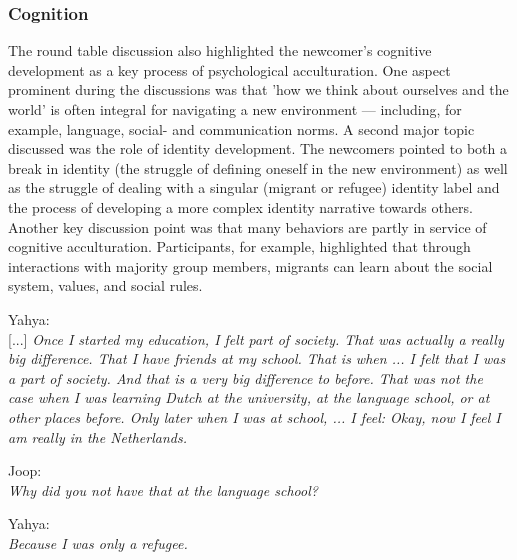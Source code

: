 \documentclass[man, 12pt, a4paper]{apa7}
\begin{document}
\subsubsection{Cognition}
The round table discussion also highlighted the newcomer’s cognitive development as a key process of psychological acculturation. One aspect prominent during the discussions was that 'how we think about ourselves and the world' is often integral for navigating a new environment --- including, for example, language, social- and communication norms. A second major topic discussed was the role of identity development. The newcomers pointed to both a break in identity (the struggle of defining oneself in the new environment) as well as the struggle of dealing with a singular (migrant or refugee) identity label and the process of developing a more complex identity narrative towards others. Another key discussion point was that many behaviors are partly in service of cognitive acculturation. Participants, for example, highlighted that through interactions with majority group members, migrants can learn about the social system, values, and social rules.
\begin{displayquote}
    Yahya:\\
    {[...]} \textit{Once I started my education, I felt part of society. That was actually a really big difference. That I have friends at my school. That is when ... I felt that I was a part of society. And that is a very big difference to before. That was not the case when I was learning Dutch at the university, at the language school, or at other places before. Only later when I was at school, ... I feel: Okay, now I feel I am really in the Netherlands.}
    
    Joop:\\
    \textit{Why did you not have that at the language school?}
    
    Yahya:\\
    \textit{Because I was only a refugee.}
\end{displayquote}
\end{document}
